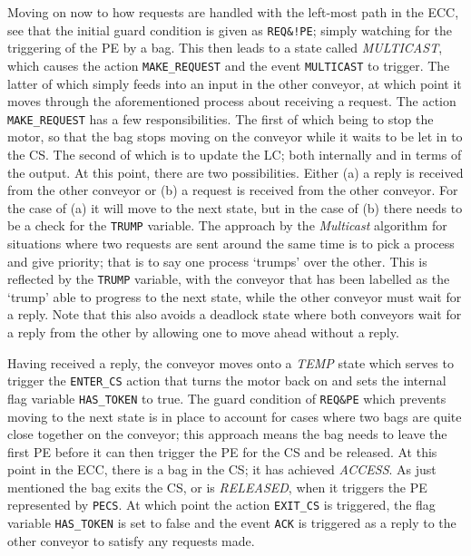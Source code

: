 \documentclass[12pt, conference]{IEEEtran}
\begin{document}
Moving on now to how requests are handled with the left-most path in the
ECC, see that the initial guard condition is given as \texttt{REQ\&!PE};
simply watching for the triggering of the PE by a bag. This then leads
to a state called \textit{MULTICAST}, which causes the action
\texttt{MAKE\_REQUEST} and the event \texttt{MULTICAST} to trigger. The latter
of which simply feeds into an input in the other conveyor, at which point it
moves through the aforementioned process about receiving a request. The action
\texttt{MAKE\_REQUEST} has a few responsibilities. The first of which being to
stop the motor, so that the bag stops moving on the conveyor while it waits to
be let in to the CS. The second of which is to update the LC; 
both internally and in terms of the output. At this point, there are two
possibilities. Either (a) a reply is received from the other conveyor or (b)
a request is received from the other conveyor. For the case of (a) it will move
to the next state, but in the case of (b) there needs to be a check for the
\texttt{TRUMP} variable. The approach by the \textit{Multicast} algorithm for
situations where two requests are sent around the same time is to pick
a process and give priority; that is to say one process `trumps' over the
other. This is reflected by the \texttt{TRUMP} variable, with the conveyor that
has been labelled as the `trump' able to progress to the next state, while the
other conveyor must wait for a reply. Note that this also avoids a deadlock
state where both conveyors wait for a reply from the other by allowing one to
move ahead without a reply.

Having received a reply, the conveyor moves onto a \textit{TEMP} state which
serves to trigger the \texttt{ENTER\_CS} action that turns the motor back on
and sets the internal flag variable \texttt{HAS\_TOKEN} to true. The guard
condition of \texttt{REQ\&PE} which prevents moving to the next state is in
place to account for cases where two bags are quite close together on the
conveyor; this approach means the bag needs to leave the first PE before
it can then trigger the PE for the CS and be released. At
this point in the ECC, there is a bag in the CS; it has achieved
\textit{ACCESS}. As just mentioned the bag exits the CS, or is
\textit{RELEASED}, when it triggers the PE represented by \texttt{PECS}.
At which point the action \texttt{EXIT\_CS} is triggered, the flag variable
\texttt{HAS\_TOKEN} is set to false and the event \texttt{ACK} is triggered as
a reply to the other conveyor to satisfy any requests made.
\end{document}
